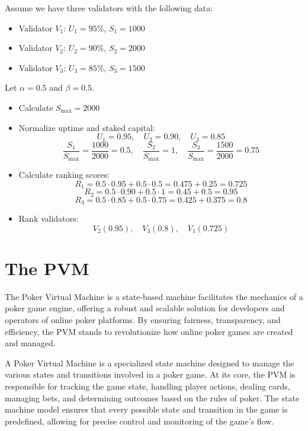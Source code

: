 \documentclass{article}
\begin{document}
Assume we have three validators with the following data:

\begin{itemize}
    \item Validator \( V_1 \): \( U_1 = 95\% \), \( S_1 = 1000 \)
    \item Validator \( V_2 \): \( U_2 = 90\% \), \( S_2 = 2000 \)
    \item Validator \( V_3 \): \( U_3 = 85\% \), \( S_3 = 1500 \)
\end{itemize}

Let \( \alpha = 0.5 \) and \( \beta = 0.5 \).

\begin{itemize}
    \item Calculate \( S_{\text{max}} = 2000 \)
    \item Normalize uptime and staked capital:
    \[
    U_1 = 0.95, \quad U_2 = 0.90, \quad U_3 = 0.85
    \]
    \[
    \frac{S_1}{S_{\text{max}}} = \frac{1000}{2000} = 0.5, \quad \frac{S_2}{S_{\text{max}}} = 1, \quad \frac{S_3}{S_{\text{max}}} = \frac{1500}{2000} = 0.75
    \]

    \item Calculate ranking scores:
    \[
    R_1 = 0.5 \cdot 0.95 + 0.5 \cdot 0.5 = 0.475 + 0.25 = 0.725
    \]
    \[
    R_2 = 0.5 \cdot 0.90 + 0.5 \cdot 1 = 0.45 + 0.5 = 0.95
    \]
    \[
    R_3 = 0.5 \cdot 0.85 + 0.5 \cdot 0.75 = 0.425 + 0.375 = 0.8
    \]

    \item Rank validators:
    \[
    V_2 (0.95), \quad V_3 (0.8), \quad V_1 (0.725)
    \]
\end{itemize}

\section{The PVM}
The Poker Virtual Machine is a state-based machine facilitates the mechanics of a poker game engine, offering a robust and scalable solution for developers and operators of online poker platforms. By ensuring fairness, transparency, and efficiency, the PVM stands to revolutionize how online poker games are created and managed.

A Poker Virtual Machine is a specialized state machine designed to manage the various states and transitions involved in a poker game. At its core, the PVM is responsible for tracking the game state, handling player actions, dealing cards, managing bets, and determining outcomes based on the rules of poker. The state machine model ensures that every possible state and transition in the game is predefined, allowing for precise control and monitoring of the game's flow.
\end{document}
